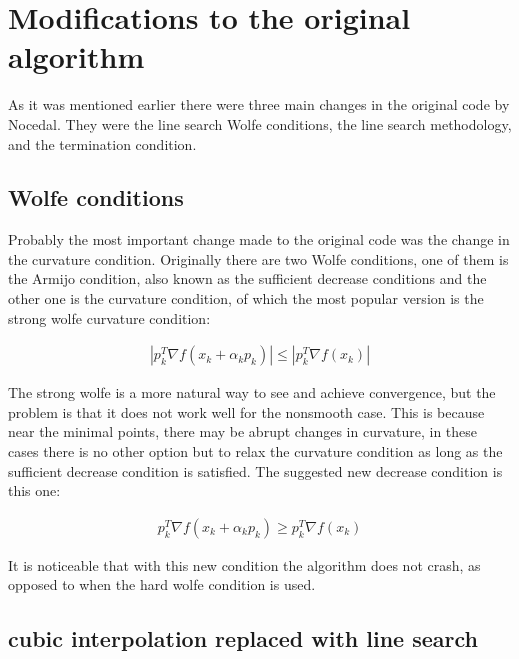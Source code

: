 \chapter{Modifications to the original algorithm}

As it was mentioned earlier there were three main changes in the original code by Nocedal\citep{lbfgsbsoftware}. They were the line search Wolfe conditions, the line search methodology, and the termination condition.

\section{Wolfe conditions}

Probably the most important change made to the original code was the change in the curvature condition. Originally there are two Wolfe conditions, one of them is the Armijo condition, also known as the sufficient decrease conditions and the other one is the curvature condition, of which the most popular version is the strong wolfe curvature condition:

\begin{equation}
  \begin{aligned}
    |p_k^T \nabla f(x_k + \alpha _k p_k)| \leq |p_k^T \nabla f(x_k)|
  \end{aligned}
\end{equation}

The strong wolfe is a more natural way to see and achieve convergence, but the problem is that it does not work well for the nonsmooth case. This is because near the minimal points, there may be abrupt changes in curvature, in these cases there is no other option but to relax the curvature condition as long as the sufficient decrease condition is satisfied. The suggested new decrease condition is this one:

\begin{equation}
  \begin{aligned}
    p_k^T \nabla f(x_k + \alpha _k p_k) \geq p_k^T \nabla f(x_k)
  \end{aligned}
\end{equation}

It is noticeable that with this new condition the algorithm does not crash, as opposed to when the hard wolfe condition is used.

\section{cubic interpolation replaced with line search}

